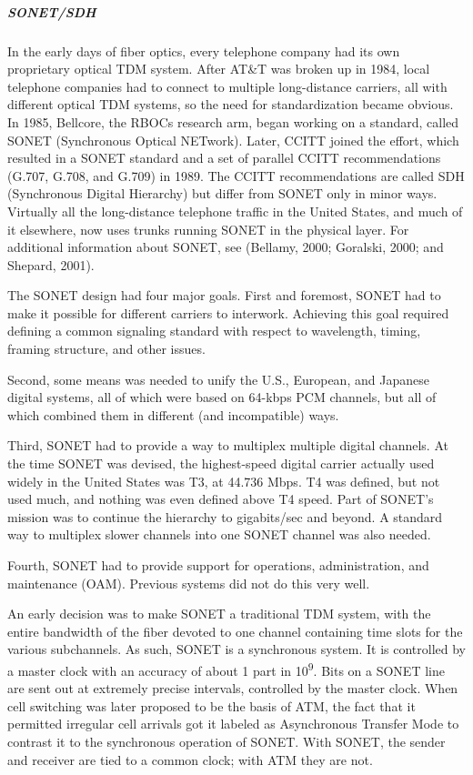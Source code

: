 \protect\hypertarget{0130661023_ch02lev1sec5.htmlux5cux23ch02lev3sec15}{}{}

\subparagraph{SONET/SDH}

In the early days of fiber optics, every telephone company had its own
proprietary optical TDM system. After AT\&T was broken up in 1984, local
telephone companies had to connect to multiple long-distance carriers,
all with different optical TDM systems, so the need for standardization
became obvious. In 1985, Bellcore, the RBOCs research arm, began working
on a standard, called {SONET} ({Synchronous Optical NETwork}). Later,
CCITT joined the effort, which resulted in a SONET standard and a set of
parallel CCITT recommendations (G.707, G.708, and G.709) in 1989. The
CCITT recommendations are called {SDH} ({Synchronous Digital Hierarchy})
but differ from SONET only in minor ways. Virtually all the
long-distance telephone traffic in the United States, and much of it
elsewhere, now uses trunks running SONET in the physical layer. For
additional information about SONET, see (Bellamy, 2000; Goralski, 2000;
and Shepard, 2001).

The SONET design had four major goals. First and foremost, SONET had to
make it possible for different carriers to interwork. Achieving this
goal required defining a common signaling standard with respect to
wavelength, timing, framing structure, and other issues.

Second, some means was needed to unify the U.S., European, and Japanese
digital systems, all of which were based on 64-kbps PCM channels, but
all of which combined them in different (and incompatible) ways.

Third, SONET had to provide a way to multiplex multiple digital
channels. At the time SONET was devised, the highest-speed digital
carrier actually used widely in the United States was T3, at 44.736
Mbps. T4 was defined, but not used much, and nothing was even defined
above T4 speed. Part of SONET's mission was to continue the hierarchy to
gigabits/sec and beyond. A standard way to multiplex slower channels
into one SONET channel was also needed.

Fourth, SONET had to provide support for operations, administration, and
maintenance (OAM). Previous systems did not do this very well.

An early decision was to make SONET a traditional TDM system, with the
entire bandwidth of the fiber devoted to one channel containing time
slots for the various subchannels. As such, SONET is a synchronous
system. It is controlled by a master clock with an accuracy of about 1
part in 10\textsuperscript{9}. Bits on a SONET line are sent out at
extremely precise intervals, controlled by the master clock. When cell
switching was later proposed to be the basis of ATM, the fact that it
permitted irregular cell arrivals got it labeled as {Asynchronous}
Transfer Mode to contrast it to the synchronous operation of SONET. With
SONET, the sender and receiver are tied to a common clock; with ATM they
are not.

